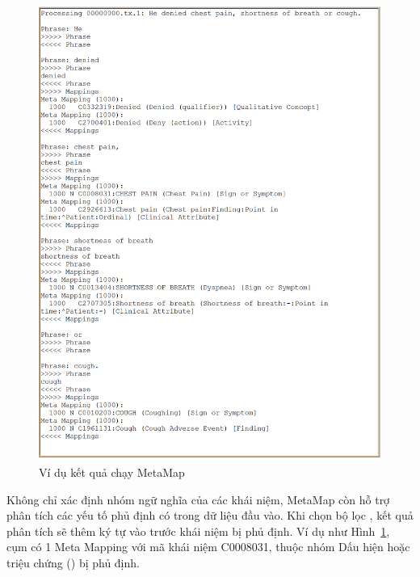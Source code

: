 \begin{figure}[h]
\centering
\includegraphics[scale=0.35]{../hinh/metamapsample.png}
\caption{Ví dụ kết quả chạy MetaMap}
\label{fig:metamapsample}
\end{figure}

Không chỉ xác định nhóm ngữ nghĩa của các khái niệm, MetaMap còn hỗ trợ phân tích các yếu tố phủ định có trong dữ liệu đầu vào. Khi chọn bộ lọc , kết quả phân tích sẽ thêm ký tự  vào trước khái niệm bị phủ định. Ví dụ như Hình~\ref{fig:metamapsample}, cụm  có 1 Meta Mapping với mã khái niệm C0008031, thuộc nhóm Dấu hiện hoặc triệu chứng () bị phủ định.
